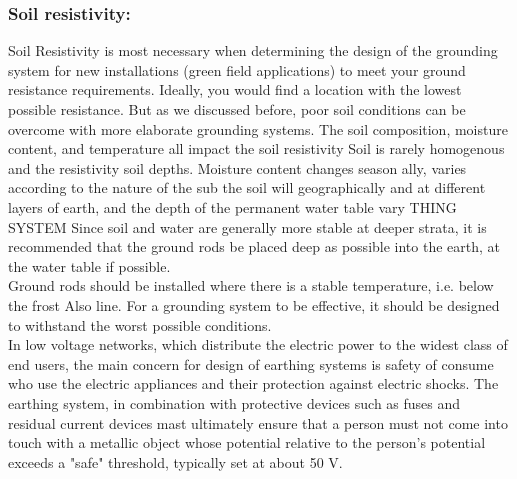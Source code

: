 \documentclass[12pt,fleqn]{book} %
\begin{document}
\subsubsection{Soil resistivity:}
Soil Resistivity is most necessary when determining the design of the grounding system for new installations (green field applications) to meet your ground resistance requirements. Ideally, you would find a location with the lowest possible resistance. But as we discussed before, poor soil conditions can be overcome with more elaborate grounding systems. The soil composition, moisture content, and temperature all impact the soil resistivity Soil is rarely homogenous and the resistivity soil depths. Moisture content changes season ally, varies according to the nature of the sub the soil will geographically and at different layers of earth, and the depth of the permanent water table vary THING SYSTEM Since soil and water are generally more stable at deeper strata, it is recommended that the ground rods be placed deep as possible into the earth, at the water table if possible. 
\\ Ground rods should be installed where there is a stable temperature, i.e. below the frost Also line. For a grounding system to be effective, it should be designed to withstand the worst possible conditions. 
\\ In low voltage networks, which distribute the electric power to the widest class of end users, the main concern for design of earthing systems is safety of consume who use the electric appliances and their protection against electric shocks. The earthing system, in combination with protective devices such as fuses and residual current devices mast ultimately ensure that a person must not come into touch with a metallic object whose potential relative to the person's potential exceeds a "safe" threshold, typically set at about 50 V.
\end{document}
